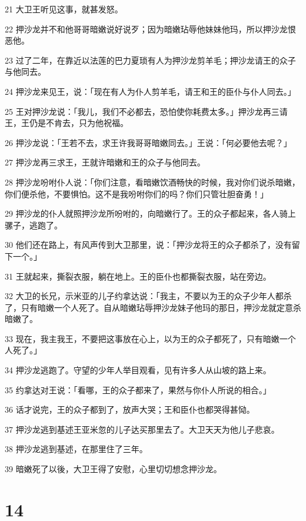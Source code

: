 \par 21 大卫王听见这事，就甚发怒。
\par 22 押沙龙并不和他哥哥暗嫩说好说歹；因为暗嫩玷辱他妹妹他玛，所以押沙龙恨恶他。
\par 23 过了二年，在靠近以法莲的巴力夏琐有人为押沙龙剪羊毛；押沙龙请王的众子与他同去。
\par 24 押沙龙来见王，说：「现在有人为仆人剪羊毛，请王和王的臣仆与仆人同去。」
\par 25 王对押沙龙说：「我儿，我们不必都去，恐怕使你耗费太多。」押沙龙再三请王，王仍是不肯去，只为他祝福。
\par 26 押沙龙说：「王若不去，求王许我哥哥暗嫩同去。」王说：「何必要他去呢？」
\par 27 押沙龙再三求王，王就许暗嫩和王的众子与他同去。
\par 28 押沙龙吩咐仆人说：「你们注意，看暗嫩饮酒畅快的时候，我对你们说杀暗嫩，你们便杀他，不要惧怕。这不是我吩咐你们的吗？你们只管壮胆奋勇！」
\par 29 押沙龙的仆人就照押沙龙所吩咐的，向暗嫩行了。王的众子都起来，各人骑上骡子，逃跑了。
\par 30 他们还在路上，有风声传到大卫那里，说：「押沙龙将王的众子都杀了，没有留下一个。」
\par 31 王就起来，撕裂衣服，躺在地上。王的臣仆也都撕裂衣服，站在旁边。
\par 32 大卫的长兄，示米亚的儿子约拿达说：「我主，不要以为王的众子少年人都杀了，只有暗嫩一个人死了。自从暗嫩玷辱押沙龙妹子他玛的那日，押沙龙就定意杀暗嫩了。
\par 33 现在，我主我王，不要把这事放在心上，以为王的众子都死了，只有暗嫩一个人死了。」
\par 34 押沙龙逃跑了。守望的少年人举目观看，见有许多人从山坡的路上来。
\par 35 约拿达对王说：「看哪，王的众子都来了，果然与你仆人所说的相合。」
\par 36 话才说完，王的众子都到了，放声大哭；王和臣仆也都哭得甚恸。
\par 37 押沙龙逃到基述王亚米忽的儿子达买那里去了。大卫天天为他儿子悲哀。
\par 38 押沙龙逃到基述，在那里住了三年。
\par 39 暗嫩死了以後，大卫王得了安慰，心里切切想念押沙龙。

\chapter{14}

